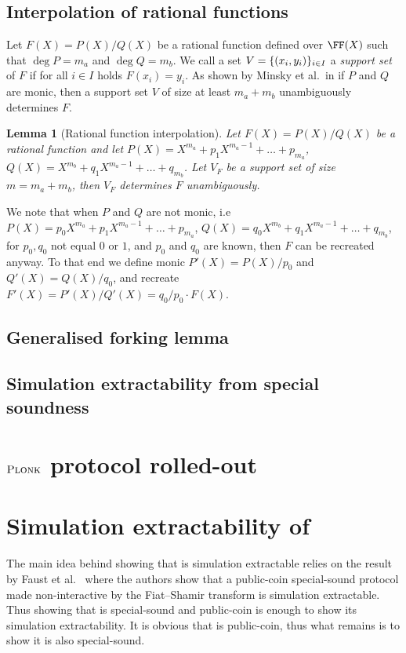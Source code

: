\documentclass[runningheads]{llncs}
\newtheorem{lemma}[theorem]{Lemma}
\theoremstyle{definition}
\begin{document}
\subsection{Interpolation of rational functions}
Let $F(X) = P(X) / Q(X)$ be a rational function defined over $\FF(X)$ such that $\deg P = m_a$ and $\deg Q = m_b$. We call a set $V = \{(x_i, y_i)\}_{i \in I}$ a \emph{support set} of $F$ if for all $i \in I$ holds $F(x_i) = y_i$. 
As shown by Minsky et al.~in \cite{TIT:MinTraZip03} if $P$ and $Q$ are monic, then a support set $V$ of size at least $m_a + m_b$ unambiguously determines $F$. 

\begin{lemma}[Rational function interpolation]
  Let $F(X) = P(X) / Q(X)$ be a rational function and let $P(X) = X^{m_a} + p_1 X^{m_a - 1} + \ldots + p_{m_a}$, $Q(X) = X^{m_b} + q_1 X^{m_a - 1} + \ldots + q_{m_b}$. Let $V_F$ be a support set of size $m = m_a + m_b$, then $V_F$ determines $F$ unambiguously.
\end{lemma}

We note that when $P$ and $Q$ are not monic, i.e~$P(X) = p_0 X^{m_a} + p_1 X^{m_a - 1} + \ldots +  p_{m_a}$, $Q(X) = q_0 X^{m_b} + q_1 X^{m_a - 1} + \ldots + q_{m_b}$, for $p_0, q_0$ not equal $0$ or $1$, and $p_0$ and $q_0$ are known, then $F$ can be recreated anyway. 
To that end we define monic $P'(X) = P(X) / p_0$ and $Q'(X) =  Q(X) / q_0$, and recreate $F'(X) = P'(X) / Q'(X) = q_0 /p_0 \cdot F(X)$.


\subsection{Generalised forking lemma}
\subsection{Simulation extractability from special soundness}
\section{$\textsc{Plonk}$ protocol rolled-out}
\section{Simulation extractability of \plonk}
The main idea behind showing that \plonk{} is simulation extractable relies on the result by Faust et al.~\cite{INDOCRYPT:FauKohMarVen12} where the authors show that a public-coin special-sound protocol made non-interactive by the Fiat--Shamir transform is simulation extractable.
Thus showing that \plonk{} is special-sound and public-coin is enough to show its simulation extractability. It is obvious that \plonk{} is public-coin, thus what remains is to show it is also special-sound.
\end{document}
